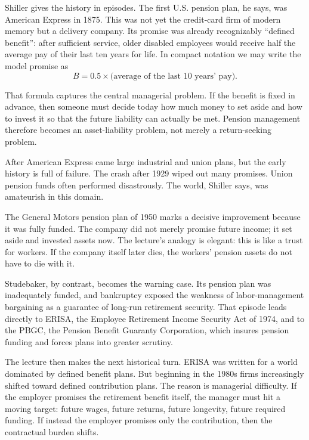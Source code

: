 Shiller gives the history in episodes. The first U.S. pension plan, he says, was American Express in 1875. This was not yet the credit-card firm of modern memory but a delivery company. Its promise was already recognizably ``defined benefit'': after sufficient service, older disabled employees would receive half the average pay of their last ten years for life. In compact notation we may write the model promise as
\begin{equation}
B = 0.5 \times \big(\text{average of the last 10 years' pay}\big).
\end{equation}

That formula captures the central managerial problem. If the benefit is fixed in advance, then someone must decide today how much money to set aside and how to invest it so that the future liability can actually be met. Pension management therefore becomes an asset-liability problem, not merely a return-seeking problem.

After American Express came large industrial and union plans, but the early history is full of failure. The crash after 1929 wiped out many promises. Union pension funds often performed disastrously. The world, Shiller says, was amateurish in this domain.

The General Motors pension plan of 1950 marks a decisive improvement because it was fully funded. The company did not merely promise future income; it set aside and invested assets now. The lecture's analogy is elegant: this is like a trust for workers. If the company itself later dies, the workers' pension assets do not have to die with it.

Studebaker, by contrast, becomes the warning case. Its pension plan was inadequately funded, and bankruptcy exposed the weakness of labor-management bargaining as a guarantee of long-run retirement security. That episode leads directly to ERISA, the Employee Retirement Income Security Act of 1974, and to the PBGC, the Pension Benefit Guaranty Corporation, which insures pension funding and forces plans into greater scrutiny.

The lecture then makes the next historical turn. ERISA was written for a world dominated by defined benefit plans. But beginning in the 1980s firms increasingly shifted toward defined contribution plans. The reason is managerial difficulty. If the employer promises the retirement benefit itself, the manager must hit a moving target: future wages, future returns, future longevity, future required funding. If instead the employer promises only the contribution, then the contractual burden shifts.

